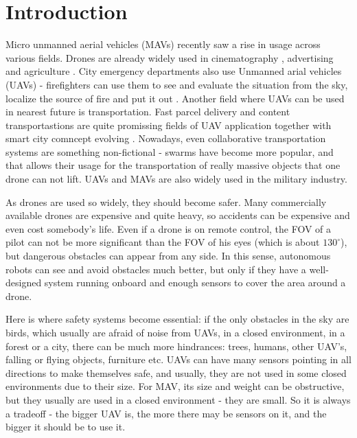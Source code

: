 \chapter{Introduction}

\label{chapter:intro}

Micro unmanned aerial vehicles (MAVs) recently saw a rise in usage across various fields. 
Drones are already widely used in cinematography \cite{Mademlis2020}, advertising \cite{Ullah2021} and agriculture \cite{Kim2019}. 
City emergency departments also use Unmanned arial vehicles (UAVs) - firefighters can use them to see and evaluate the situation from the sky, localize the source of fire and put it out \cite{Pritzl2021}.
Another field where UAVs can be used in nearest future is transportation. 
Fast parcel delivery \cite{San2018} and content transportastions \cite{Gupta2021,Aloqaily2022} are quite promissing fields of UAV application together with smart city comncept evolving \cite{Ortiz2019}.
Nowadays, even collaborative transportation systems are something non-fictional - swarms have become more popular, and that allows their usage for the transportation of really massive objects \cite{Bacelar2020} that one drone can not lift. 
UAVs and MAVs are also widely used in the military industry.

As drones are used so widely, they should become safer. 
Many commercially available drones are expensive and quite heavy, so accidents can be expensive and even cost somebody's life. 
Even if a drone is on remote control, the FOV of a pilot can not be more significant than the FOV of his eyes (which is about $130^\circ$), but dangerous obstacles can appear from any side.
In this sense, autonomous robots can see and avoid obstacles much better, but only if they have a well-designed system running onboard and enough sensors to cover the area around a drone.

Here is where safety systems become essential: if the only obstacles in the sky are birds, which usually are afraid of noise from UAVs, in a closed environment, in a forest or a city, there can be much more hindrances: trees, humans, other UAV's, falling or flying objects, furniture etc.
UAVs can have many sensors pointing in all directions to make themselves safe, and usually, they are not used in some closed environments due to their size.
For MAV, its size and weight can be obstructive, but they usually are used in a closed environment - they are small.
So it is always a tradeoff - the bigger UAV is, the more there may be sensors on it, and the bigger it should be to use it. 

